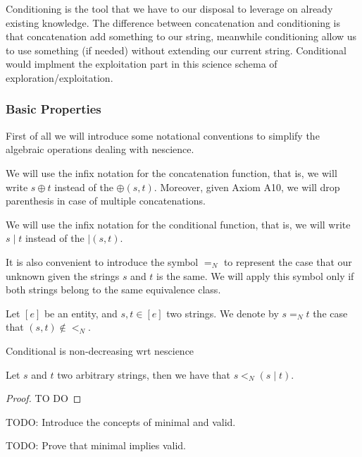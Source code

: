 Conditioning is the tool that we have to our disposal to leverage on already existing knowledge. The difference between concatenation and conditioning is that concatenation add something to our string, meanwhile conditioning allow us to use something (if needed) without extending our current string. Conditional would implment the exploitation part in this science schema of exploration/exploitation.


\subsubsection*{Basic Properties}

First of all we will introduce some notational conventions to simplify the algebraic operations dealing with nescience.

\begin{notation}
We will use the infix notation for the concatenation function, that is, we will write $s \oplus t$ instead of the $\oplus(s, t)$. Moreover, given Axiom A10, we will drop parenthesis in case of multiple concatenations.

We will use the infix notation for the conditional function, that is, we will write $s \mid t$ instead of the $\mid(s, t)$.
\end{notation}

It is also convenient to introduce the symbol $=_N$ to represent the case that our unknown given the strings $s$ and $t$ is the same. We will apply this symbol only if both strings belong to the same equivalence class.

\begin{notation}
Let $[e]$ be an entity, and $s, t \in [e]$ two strings. We denote by $ s =_N t$ the case that $(s, t) \notin <_N$.
\end{notation}

{\color{red} Conditional is non-decreasing wrt nescience}

\begin{proposition}
Let $s$ and $t$ two arbitrary strings, then we have that $s <_N (s \mid t)$.
\end{proposition}
\begin{proof}
{\color{red} TO DO}
\end{proof}

{\color{red} TODO: Introduce the concepts of minimal and valid.}

{\color{red} TODO: Prove that minimal implies valid.}

